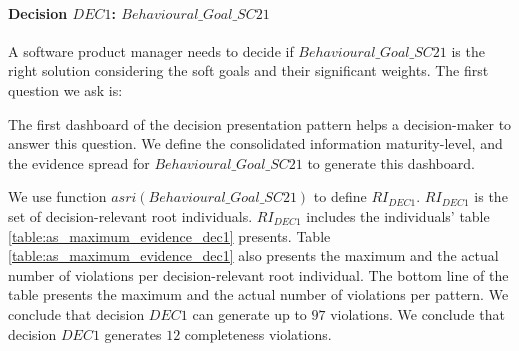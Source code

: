 \paragraph{Decision $DEC1$: $Behavioural\_Goal\_SC21$}
A software product manager needs to decide if $Behavioural\_Goal\_SC21$ is the right solution considering the soft goals and their significant weights. The first question we ask is:

\begin{center}
\large\color{document}{Is the information ready for this decision?}
\end{center}

The first dashboard of the decision presentation pattern helps a decision-maker to answer this question. We define the consolidated information maturity-level, and the evidence spread for $Behavioural\_Goal\_SC21$ to generate this dashboard.

We use function $asri(Behavioural\_Goal\_SC21)$ to define $RI_{DEC1}$. $RI_{DEC1}$ is the set of decision-relevant root individuals. $RI_{DEC1}$ includes the individuals' table \ref{table:as_maximum_evidence_dec1} presents. Table \ref{table:as_maximum_evidence_dec1} also presents the maximum and the actual number of violations per decision-relevant root individual. The bottom line of the table presents the maximum and the actual number of violations per pattern. We conclude that decision $DEC1$ can generate up to $97$ violations. We conclude that decision $DEC1$ generates $12$ completeness violations. 


